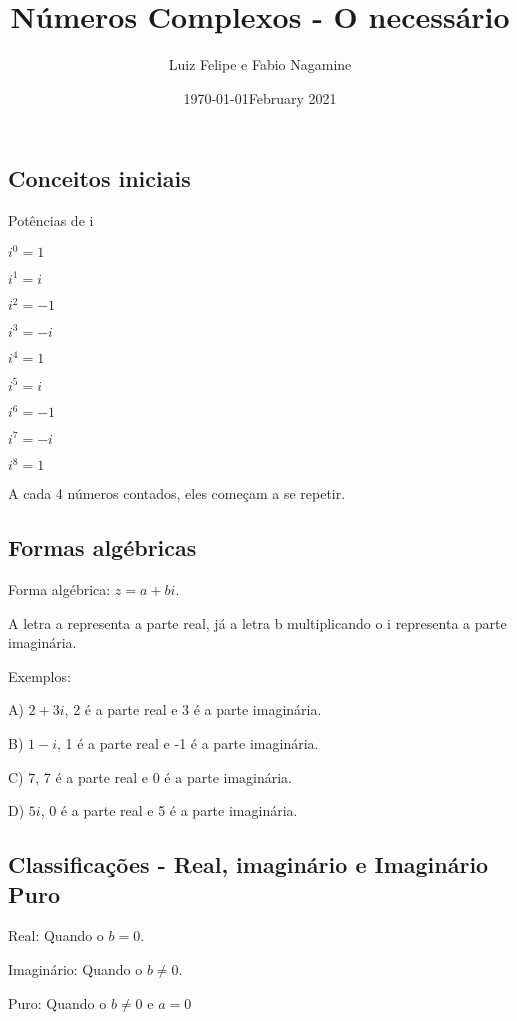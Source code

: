 \documentclass[]{article}
\title{Números Complexos - O necessário}
\author{Luiz Felipe e Fabio Nagamine}
\date{\today}
\date{February 2021}
\begin{document}
\maketitle
\begin{large}
\section{Conceitos iniciais}
\begin{flushleft}

Potências de i \vspace{.3cm}

$i^0 = 1$

$i^1 = i$

$i^2 = -1$

$i^3 = -i$

$i^4 = 1$

$i^5 = i$

$i^6 = -1$

$i^7 = -i$

$i^8 = 1$ \vspace{.3cm}

A cada 4 números contados, eles começam a se repetir.

\subsection{Formas algébricas}

Forma algébrica: $z=a+bi$.

A letra a representa a parte real, já a letra b multiplicando o i representa a parte imaginária.

Exemplos: \vspace{.3cm}

A) $2+3i$, 2 é a parte real e 3 é a parte imaginária.

B) $1-i$, 1 é a parte real e -1 é a parte imaginária.

C) $7$, 7 é a parte real e 0 é a parte imaginária.

D) $5i$, 0 é a parte real e 5 é a parte imaginária.

\subsection{Classificações - Real, imaginário e Imaginário Puro}

Real: Quando o $b = 0$.

Imaginário: Quando o $b \not= 0$.

Puro: Quando o $b \not= 0$ e $a = 0$


\end{flushleft}
\end{large}
\end{document}
